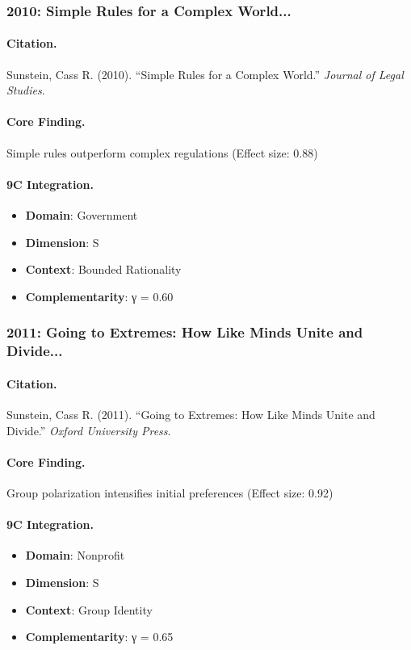 \subsubsection{2010: Simple Rules for a Complex World...}

\paragraph{Citation.}
Sunstein, Cass R. (2010). ``Simple Rules for a Complex World.''
\textit{Journal of Legal Studies}.

\paragraph{Core Finding.}
Simple rules outperform complex regulations (Effect size: 0.88)

\paragraph{9C Integration.}
\begin{itemize}[nosep]
  \item \textbf{Domain}: Government
  \item \textbf{Dimension}: S
  \item \textbf{Context}: Bounded Rationality
  \item \textbf{Complementarity}: γ = 0.60
\end{itemize}

\subsubsection{2011: Going to Extremes: How Like Minds Unite and Divide...}

\paragraph{Citation.}
Sunstein, Cass R. (2011). ``Going to Extremes: How Like Minds Unite and Divide.''
\textit{Oxford University Press}.

\paragraph{Core Finding.}
Group polarization intensifies initial preferences (Effect size: 0.92)

\paragraph{9C Integration.}
\begin{itemize}[nosep]
  \item \textbf{Domain}: Nonprofit
  \item \textbf{Dimension}: S
  \item \textbf{Context}: Group Identity
  \item \textbf{Complementarity}: γ = 0.65
\end{itemize}

